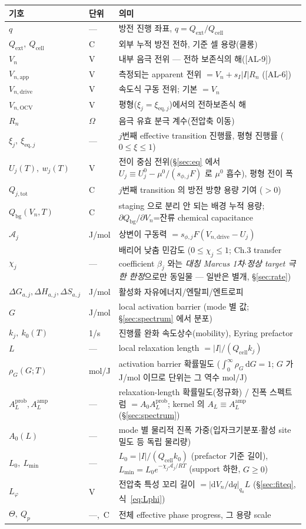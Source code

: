 \documentclass[11pt,a4paper]{article}
\newcommand{\dd}{\mathrm{d}}
\newcommand{\eq}{\mathrm{eq}}
\newcommand{\app}{\mathrm{app}}
\newcommand{\drive}{\mathrm{drive}}
\newcommand{\bg}{\mathrm{bg}}
\newcommand{\cell}{\mathrm{cell}}
\newcommand{\ext}{\mathrm{ext}}
\newcommand{\OCV}{\mathrm{OCV}}
\newcommand{\tot}{\mathrm{tot}}
\newcommand{\AL}[1]{\textsf{[AL-#1]}}
\begin{document}
\begin{longtable}{p{} p{} p{}}
\toprule 기호 & 단위 & 의미 \\ \midrule \endhead
$q$ & --- & 방전 진행 좌표, $q=Q_\ext/Q_\cell$ \\
$Q_\ext,\ Q_\cell$ & C & 외부 누적 방전 전하, 기준 셀 용량(쿨롱) \\
$V_n$ & V & 내부 음극 전위 — 전하 보존식의 해(\AL{9}) \\
$V_{n,\app}$ & V & 측정되는 apparent 전위 $=V_n+s_I|I|R_n$ (\AL{6}) \\
$V_{n,\drive}$ & V & 속도식 구동 전위; 기본 $=V_n$ \\
$V_{n,\OCV}$ & V & 평형($\xi_j=\xi_{\eq,j}$)에서의 전하보존식 해 \\
$R_n$ & $\Omega$ & 음극 유효 분극 계수(전압축 이동) \\
$\xi_j,\ \xi_{\eq,j}$ & --- & $j$번째 effective transition 진행률, 평형 진행률 ($0\!\le\!\xi\!\le\!1$) \\
$U_j(T),\ w_j(T)$ & V & 전이 중심 전위(\S\ref{sec:eq} 에서 $U_j\equiv U_j^0-\mu^0/(s_{\phi,j}F)$ 로 $\mu^0$ 흡수), 평형 전이 폭 \\
$Q_{j,\tot}$ & C & $j$번째 transition 의 방전 방향 용량 기여 ($>0$) \\
$Q_\bg(V_n,T)$ & C & staging 으로 분리 안 되는 배경 누적 용량; $\partial Q_\bg/\partial V_n$=잔류 chemical capacitance \\
$\mathcal A_j$ & J/mol & 상변이 구동력 $=s_{\phi,j}F(V_{n,\drive}-U_j)$ \\
$\chi_j$ & --- & 배리어 낮춤 민감도 ($0\le\chi_j\le1$; Ch.3 transfer coefficient $\beta_j$ 와는 \emph{대칭 Marcus 1차$\cdot$정상 target 극한 한정}으로만 동일물 — 일반은 별개, \S\ref{sec:rate}) \\
$\Delta G_{a,j},\Delta H_{a,j},\Delta S_{a,j}$ & J/mol & 활성화 자유에너지/엔탈피/엔트로피 \\
$G$ & J/mol & local activation barrier (mode 별 값; \S\ref{sec:spectrum} 에서 분포) \\
$k_j,\ k_0(T)$ & 1/s & 진행률 완화 속도상수(mobility), Eyring prefactor \\
$L$ & --- & local relaxation length $=|I|/(Q_\cell k_j)$ \\
$\rho_G(G;T)$ & mol/J & activation barrier 확률밀도 ($\int_0^\infty\rho_G\,\dd G=1$; $G$ 가 J/mol 이므로 단위는 그 역수 mol/J) \\
$A_L^{\mathrm{prob}},A_L^{\mathrm{amp}}$ & --- & relaxation-length 확률밀도(정규화) / 진폭 스펙트럼 $=A_0 A_L^{\mathrm{prob}}$; kernel 의 $A_L\equiv A_L^{\mathrm{amp}}$ (\S\ref{sec:spectrum}) \\
$A_0(L)$ & --- & mode 별 물리적 진폭 가중(입자크기분포$\cdot$활성 site 밀도 등 독립 물리량) \\
$L_0,\ L_{\min}$ & --- & $L_0=|I|/(Q_\cell k_0)$ (prefactor 기준 길이), $L_{\min}=L_0 e^{-\chi_j\mathcal A_j/RT}$ (support 하한, $G\!\ge\!0$) \\
$L_\varphi$ & V & 전압축 특성 꼬리 길이 $=|\dd V_n/\dd q|_{q_a}L$ (\S\ref{sec:fiteq}, 식~\eqref{eq:Lphi}) \\
$\Theta,\ Q_p$ & ---,\ C & 전체 effective phase progress, 그 용량 scale \\
\bottomrule
\end{longtable}
\end{document}
